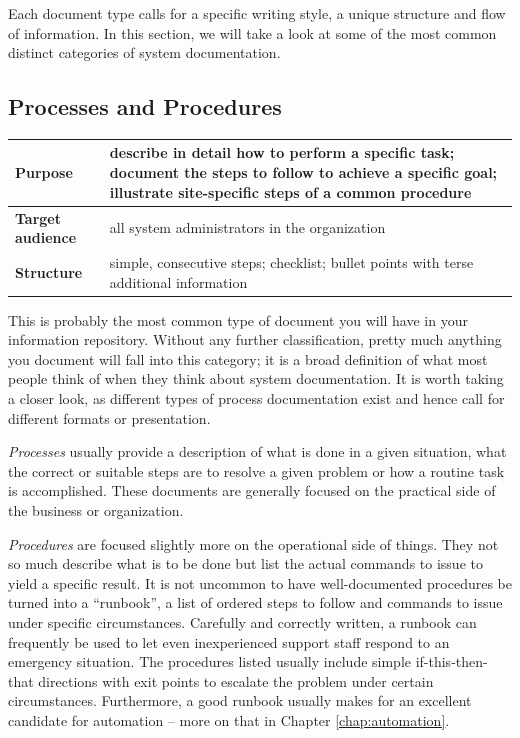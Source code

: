 Each document type calls for a specific writing style,
a unique structure and flow of information.  In this
section, we will take a look at some of the most
common distinct categories of system documentation.

\subsection{Processes and Procedures}
\label{documentation:types:processes}

\vspace{.25in}
\begin{tabular}[ht]{ l p{}}
	\hline
	{\bf Purpose} & describe in detail how to perform a specific task; \newline
			document the steps to follow to achieve a specific goal; \newline
			illustrate site-specific steps of a common procedure \\
	\hline
	{\bf Target audience} & all system administrators in the organization \\
	\hline
	{\bf Structure} & simple, consecutive steps; \newline
				checklist; \newline
				bullet points with terse additional information\\
	\hline
\end{tabular}
\vspace{.25in}

This is probably the most common type of document you
will have in your information repository.  Without any
further classification, pretty much anything you
document will fall into this category; it is a broad
definition of what most people think of when they
think about system documentation.  It is worth taking
a closer look, as different types of process
documentation exist and hence call for different
formats or presentation.

{\em Processes} usually provide a description of what
is done in a given situation, what the correct or
suitable steps are to resolve a given problem or how a
routine task is accomplished.  These documents are
generally focused on the practical side of the
business or organization.

{\em Procedures} are focused slightly more on the
operational side of things.  They not so much describe
what is to be done but list the actual commands to
issue to yield a specific result.  It is not uncommon
to have well-documented procedures be turned into a
``runbook'', a list of ordered steps to
follow and commands to issue under specific
circumstances.  Carefully and correctly written, a
runbook can frequently be used to let even
inexperienced support staff respond to an emergency
situation.  The procedures listed usually include
simple if-this-then-that directions with exit points
to escalate the problem under certain circumstances.
Furthermore, a good runbook usually makes for an
excellent candidate for automation -- more on that in
Chapter \ref{chap:automation}.


